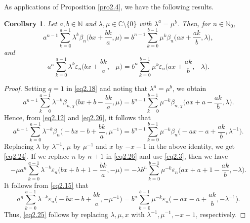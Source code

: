 \documentclass[reqno]{amsart}
\numberwithin{equation}{section}
\newtheorem{corollary}[thm]{Corollary}
\begin{document}
As applications of Proposition \ref{pro2.4}, we have the following results.

\begin{corollary}\label{cor2.5} Let $a,b\in\mathbb{N}$ and $\lambda,\mu\in\mathbb{C}\setminus\{0\}$ with $\lambda^{a}=\mu^{b}$. Then, for $n\in\mathbb{N}_{0}$,
\begin{equation}\label{eq2.24}
a^{n-1}\sum_{k=0}^{a-1}\lambda^{k}\beta_{n}\biggl(bx+\frac{bk}{a},\mu\biggl)=b^{n-1}\sum_{k=0}^{b-1}\mu^{k}\beta_{n}\biggl(ax+\frac{ak}{b},\lambda\biggl),
\end{equation}
and
\begin{equation}\label{eq2.25}
a^{n}\sum_{k=0}^{a-1}\lambda^{k}\varepsilon_{n}\biggl(bx+\frac{bk}{a},-\mu\biggl)=b^{n}\sum_{k=0}^{b-1}\mu^{k}\varepsilon_{n}\biggl(ax+\frac{ak}{b},-\lambda\biggl).
\end{equation}
\end{corollary}

\begin{proof}
Setting $q=1$ in \eqref{eq2.18} and noting that $\lambda^{a}=\mu^{b}$, we obtain
\begin{equation}\label{eq2.26}
a^{n-1}\sum_{k=0}^{a-1}\lambda^{-k}\beta_{n,\chi}\biggl(bx+b-\frac{bk}{a},\mu\biggl)=b^{n-1}\sum_{k=0}^{b-1}\mu^{-k}\beta_{n,\chi}\biggl(ax+a-\frac{ak}{b},\lambda\biggl).
\end{equation}
Hence, from \eqref{eq2.12} and \eqref{eq2.26}, it follows that
\begin{equation*}
a^{n-1}\sum_{k=0}^{a-1}\lambda^{-k}\beta_{n}\biggl(-bx-b+\frac{bk}{a},\mu^{-1}\biggl)=b^{n-1}\sum_{k=0}^{b-1}\mu^{-k}\beta_{n}\biggl(-ax-a+\frac{ak}{b},\lambda^{-1}\biggl).
\end{equation*}
Replacing $\lambda$ by $\lambda^{-1}$, $\mu$ by $\mu^{-1}$ and $x$ by $-x-1$ in the above identity, we get \eqref{eq2.24}. If we replace $n$ by $n+1$ in \eqref{eq2.26} and use \eqref{eq2.3}, then we have
\begin{equation*}
-\mu a^{n}\sum_{k=0}^{a-1}\lambda^{-k}\varepsilon_{n}\biggl(bx+b+1-\frac{bk}{a},-\mu\biggl)=-\lambda b^{n}\sum_{k=0}^{b-1}\mu^{-k}\varepsilon_{n}\biggl(ax+a+1-\frac{ak}{b},-\lambda\biggl).
\end{equation*}
It follows from \eqref{eq2.15} that
\begin{equation*}
a^{n}\sum_{k=0}^{a-1}\lambda^{-k}\varepsilon_{n}\biggl(-bx-b+\frac{bk}{a},-\mu^{-1}\biggl)=b^{n}\sum_{k=0}^{b-1}\mu^{-k}\varepsilon_{n}\biggl(-ax-a+\frac{ak}{b},-\lambda^{-1}\biggl).
\end{equation*}
Thus, \eqref{eq2.25} follows by replacing $\lambda,\mu,x$ with $\lambda^{-1}, \mu^{-1},-x-1$, respectively.
\end{proof}
\end{document}
